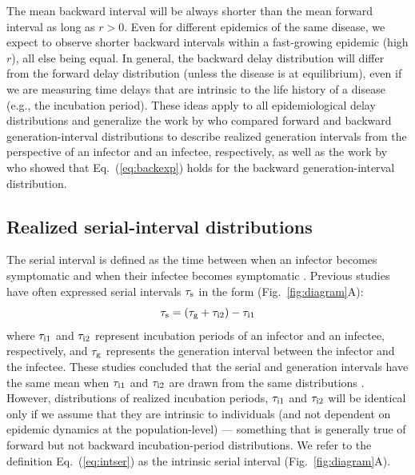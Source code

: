\documentclass[12pt]{article}
\newcommand{\eref}[1]{Eq.~(\ref{eq:#1})}
\newcommand{\fref}[1]{Fig.~\ref{fig:#1}}
\newcommand{\gtime}{\tau_{\rm g}} %
\begin{document}
The mean backward interval will be always shorter than the mean forward interval as long as $r > 0$.
Even for different epidemics of the same disease, we expect to observe shorter backward intervals within a fast-growing epidemic (high $r$), all else being equal.
In general, the backward delay distribution will differ from the forward delay distribution (unless the disease is at equilibrium), even if we are measuring time delays that are intrinsic to the life history of a disease (e.g., the incubation period).
These ideas apply to all epidemiological delay distributions and generalize the work by \cite{champredon2015intrinsic} who compared forward and backward generation-interval distributions to describe realized generation intervals from the perspective of an infector and an infectee, respectively, as well as the work by \cite{britton2019estimation} who showed that \eref{backexp} holds for the backward generation-interval distribution.

\subsection{Realized serial-interval distributions}

The serial interval is defined as the time between when an infector becomes symptomatic and when their infectee becomes symptomatic \citep{svensson2007note}.
Previous studies have often expressed serial intervals $\tau_{\rm s}$ in the form (\fref{diagram}A):
\begin{equation}
\tau_{\rm s} = (\gtime + \tau_{\rm i2}) - \tau_{\rm i1}
\label{eq:intser}
\end{equation}
where $\tau_{\rm i1}$ and $\tau_{\rm i2}$ represent incubation periods of an infector and
an infectee, respectively, and $\gtime$ represents the generation
interval between the infector and the infectee.
These studies concluded that the serial and generation intervals have the same mean when $\tau_{\rm i1}$ and $\tau_{\rm i2}$ are drawn from the same distributions \citep{svensson2007note,klinkenberg2011correlation,champredon2018equivalence, britton2019estimation}.
However, distributions of realized incubation periods, $\tau_{\rm i1}$ and $\tau_{\rm i2}$ will be identical only if we assume that they are intrinsic to individuals (and not dependent on epidemic dynamics at the population-level) ---
something that is generally true of forward but not backward incubation-period distributions.
We refer to the definition \eref{intser} as the intrinsic serial interval (\fref{diagram}A).
\end{document}
